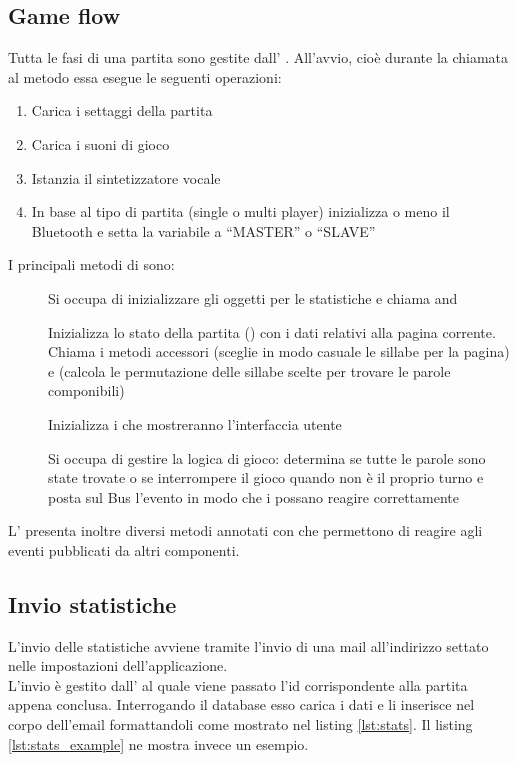 \subsection{Game flow}
\label{sec:game_flow}
Tutta le fasi di una partita sono gestite dall' .
All'avvio, cioè durante la chiamata al metodo  essa esegue le seguenti operazioni:
\begin{enumerate}
\item Carica i settaggi della partita
\item Carica i suoni di gioco
\item Istanzia il sintetizzatore vocale 
\item In base al tipo di partita (single o multi player) inizializza o meno il Bluetooth e setta la variabile  a ``MASTER'' o ``SLAVE''
\end{enumerate}

I principali metodi di  sono:
\begin{description}
\item[] Si occupa di inizializzare gli oggetti per le statistiche e chiama  and 
\item[] Inizializza lo stato della partita () con i dati relativi alla pagina corrente. Chiama i metodi accessori  (sceglie in modo casuale le sillabe per la pagina) e  (calcola le permutazione delle sillabe scelte per trovare le parole componibili)
\item[] Inizializza i  che mostreranno l'interfaccia utente
\item[] Si occupa di gestire la logica di gioco: determina se tutte le parole sono state trovate o se interrompere il gioco quando non è il proprio turno e posta sul Bus l'evento  in modo che i  possano reagire correttamente
\end{description}

L' presenta inoltre diversi metodi annotati con  che permettono di reagire agli eventi pubblicati da altri componenti.

\subsection{Invio statistiche}
\label{sec:stats_send}
L'invio delle statistiche avviene tramite l'invio di una mail all'indirizzo settato nelle impostazioni dell'applicazione.\\
L'invio è gestito dall'  al quale viene passato l'id corrispondente alla partita appena conclusa. Interrogando il database esso carica i dati e li inserisce nel corpo dell'email formattandoli come mostrato nel listing \ref{lst:stats}. Il listing \ref{lst:stats_example} ne mostra invece un esempio.

